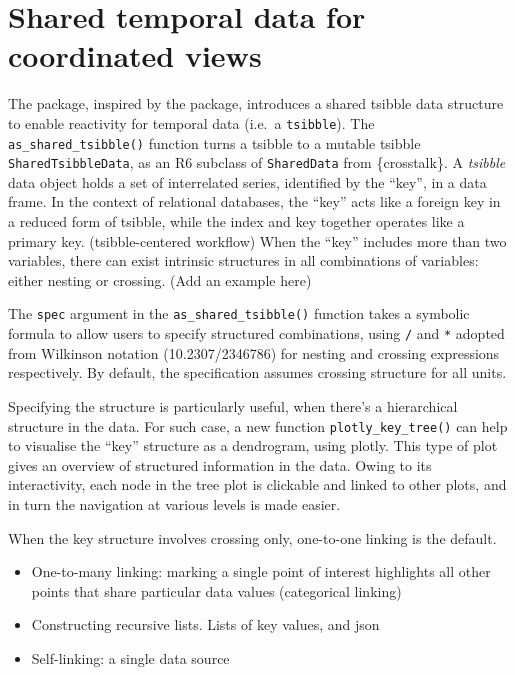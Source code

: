 \hypertarget{shared-temporal-data-for-coordinated-views}{%
\section{Shared temporal data for coordinated
views}\label{shared-temporal-data-for-coordinated-views}}

The  package, inspired by the 
package, introduces a shared tsibble data structure to enable reactivity
for temporal data (i.e.~a \texttt{tsibble}). The
\texttt{as\_shared\_tsibble()} function turns a tsibble to a mutable
tsibble \texttt{SharedTsibbleData}, as an R6 subclass of
\texttt{SharedData} from \{crosstalk\}. A \emph{tsibble} data object
holds a set of interrelated series, identified by the ``key'', in a data
frame. In the context of relational databases, the ``key'' acts like a
foreign key in a reduced form of tsibble, while the index and key
together operates like a primary key. (tsibble-centered workflow) When
the ``key'' includes more than two variables, there can exist intrinsic
structures in all combinations of variables: either nesting or crossing.
(Add an example here)

The \texttt{spec} argument in the \texttt{as\_shared\_tsibble()}
function takes a symbolic formula to allow users to specify structured
combinations, using \texttt{/} and \texttt{*} adopted from Wilkinson
notation (10.2307/2346786) for nesting and crossing expressions
respectively. By default, the specification assumes crossing structure
for all units.

Specifying the structure is particularly useful, when there's a
hierarchical structure in the data. For such case, a new function
\texttt{plotly\_key\_tree()} can help to visualise the ``key'' structure
as a dendrogram, using plotly. This type of plot gives an overview of
structured information in the data. Owing to its interactivity, each
node in the tree plot is clickable and linked to other plots, and in
turn the navigation at various levels is made easier.

When the key structure involves crossing only, one-to-one linking is the
default.

\begin{itemize}
\tightlist
\item
  One-to-many linking: marking a single point of interest highlights all
  other points that share particular data values (categorical linking)
\item
  Constructing recursive lists. Lists of key values, and json
\item
  Self-linking: a single data source
\end{itemize}

